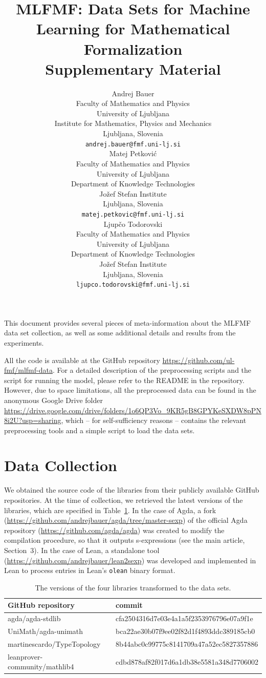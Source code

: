 \documentclass{article}
\title{MLFMF: Data Sets for Machine Learning for Mathematical Formalization\\ Supplementary Material}
\author{%
  Andrej Bauer \\
  Faculty of Mathematics and Physics \\
  University of Ljubljana \\
  Institute for Mathematics, Physics and Mechanics \\
  Ljubljana, Slovenia \\
  \texttt{andrej.bauer@fmf.uni-lj.si} \\
  \And
  Matej Petković \\
  Faculty of Mathematics and Physics \\
  University of Ljubljana \\
  Department of Knowledge Technologies \\
  Jožef Stefan Institute \\
  Ljubljana, Slovenia \\
  \texttt{matej.petkovic@fmf.uni-lj.si} \\
  \And
  Ljupčo Todorovski \\
  Faculty of Mathematics and Physics \\
  University of Ljubljana \\
  Department of Knowledge Technologies \\
  Jožef Stefan Institute \\
  Ljubljana, Slovenia \\
  \texttt{ljupco.todorovski@fmf.uni-lj.si}
}
\begin{document}
\maketitle
This document provides several pieces of meta-information about the MLFMF data set collection, as well as some additional details and results from the experiments.

All the code is available at the GitHub repository \url{https://github.com/ul-fmf/mlfmf-data}. For a detailed description of the preprocessing scripts and the script for running the model, please refer to the README in the repository. However, due to space limitations, all the preprocessed data can be found in the anonymous Google Drive folder \url{https://drive.google.com/drive/folders/1o6QP3Vo_9KR5gB8GPYKeSXDW8pPN8i2U?usp=sharing}, which -- for self-sufficiency reasons -- contains the relevant preprocessing tools and a simple script to load the data sets.

\section{Data Collection}
We obtained the source code of the libraries from their publicly available GitHub repositories. At the time of collection, we retrieved the latest versions of the libraries, which are specified in Table~\ref{tab:data-version}.
In the case of Agda, a fork (\url{https://github.com/andrejbauer/agda/tree/master-sexp}) of the official Agda repository (\url{https://github.com/agda/agda}) was created to modify the compilation procedure, so that it outputs s-expressions (see the main article, Section~3). In the case of Lean, a standalone tool (\url{https://github.com/andrejbauer/lean2sexp}) was developed and implemented in Lean to process entries in Lean's \texttt{olean} binary format.

\begin{table}[htbp]
  \centering
  \caption{The versions of the four libraries transformed to the data sets.}
    \begin{tabular}{l|l}
    GitHub repository & commit\\
    \hline
     agda/agda-stdlib & cfa2504316d7e03e4a1a5f2353976796e07a9f1e \\
     UniMath/agda-unimath & bca22ae30b07f9ee02f82d1f4893ddc389185cb0 \\
     martinescardo/TypeTopology & 8b44abc0c99775c8141709a47a52ec5827357886 \\
    leanprover-community/mathlib4 & cdbd878af82f017d6a1db38e5581a348d7706002 \\
    \end{tabular}%
  \label{tab:data-version}%
\end{table}%
\end{document}

